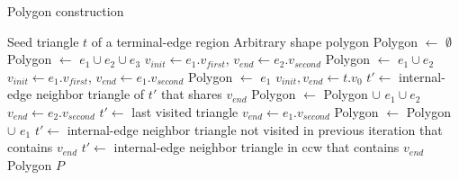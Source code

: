 \documentclass[lineno,pdflatex,sn-mathphys]{sn-jnl}%
\theoremstyle{thmstyleone}%
\theoremstyle{thmstyletwo}%
\theoremstyle{thmstylethree}%
\begin{document}
\begin{algorithm}
    \caption{Polygon construction}\label{algo:travelphase}
    \begin{algorithmic}[1]
    \Require Seed triangle $t$ of a terminal-edge region
    \Ensure Arbitrary shape polygon
    \State Polygon $\leftarrow$ $\emptyset$ \label{algotravel:init}
         \label{algotravel:initial3edgescase}
            \State \Return Polygon $\leftarrow$ $e_1 \cup	 e_2 \cup	e_3$
         \label{algotravel:initial2edgescase}
            \State $v_{init} \leftarrow e_1.v_{first}$,  $v_{end} \leftarrow e_2.v_{second}$
            \State Polygon $\leftarrow$ $e_1 \cup e_2$
         \label{algotravel:initial1edgescase}
            \State $v_{init} \leftarrow e_1.v_{first}$, $v_{end} \leftarrow e_1.v_{second}$
            \State Polygon $\leftarrow$ $e_1$
         \label{algotravel:initial0edgescase}
            \State $v_{init}, v_{end} \leftarrow t.v_{0}$
        \EndIf    
    \State $t' \leftarrow$ internal-edge neighbor triangle of $t'$ that shares $v_{end}$  \label{algotravel:initend}
     \label{algotravel:end}
         \label{algotravel:twoedgecase}
            \State Polygon $\leftarrow$ Polygon $\cup$ $e_1 \cup e_2$
            \State $v_{end} \leftarrow e_2.v_{second}$
            \State $t' \leftarrow$ last visited triangle
         \label{algotravel:oneedgecase}
            \State $v_{end} \leftarrow e_1.v_{second}$
            \State Polygon $\leftarrow$ Polygon $\cup$ $e_1$
            \State $t' \leftarrow$ internal-edge neighbor triangle not visited in previous iteration that contains $v_{end}$
        \Else \label{algotravel:noedgecase}
            \State $t' \leftarrow$ internal-edge neighbor triangle in ccw that contains $v_{end}$
        \EndIf 
    \EndWhile
    \State \Return Polygon $P$
    \end{algorithmic}
\end{algorithm}
\end{document}
